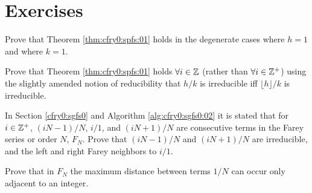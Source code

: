 \section{Exercises}

\begin{vworkexercisestatement}
\label{exe:cfry0:sexe0:01}
Prove that Theorem \ref{thm:cfry0:spfs:01}
holds in the degenerate cases where $h=1$ and where $k=1$.
\end{vworkexercisestatement}
\vworkexercisefooter{}

\begin{vworkexercisestatement}
\label{exe:cfry0:sexe0:02}
Prove that Theorem \ref{thm:cfry0:spfs:01} holds $\forall i \in {\mathbb{Z}}$
(rather than $\forall i \in {\mathbb{Z}^+}$) using
the slightly amended notion of reducibility that $h/k$ is irreducible iff
$\lfloor h \rfloor / k$ is irreducible.
\end{vworkexercisestatement}
\vworkexercisefooter{}

\begin{vworkexercisestatement}
In Section \ref{cfry0:sgfs0} and Algorithm \ref{alg:cfry0:sgfs0:02}
it is stated that for $i \in {\mathbb{Z}^+}$, 
$(iN-1)/N$, $i/1$, and $(iN+1)/N$ are consecutive terms in the Farey series
or order $N$, $F_N$.  Prove that $(iN-1)/N$ and $(iN+1)/N$ are irreducible,
and the left and right Farey neighbors to $i/1$.
\end{vworkexercisestatement}
\vworkexercisefooter{}

\begin{vworkexercisestatement}
Prove that in $F_N$ the maximum distance between terms $1/N$ can occur
only adjacent to an integer.
\end{vworkexercisestatement}
\vworkexercisefooter{}


